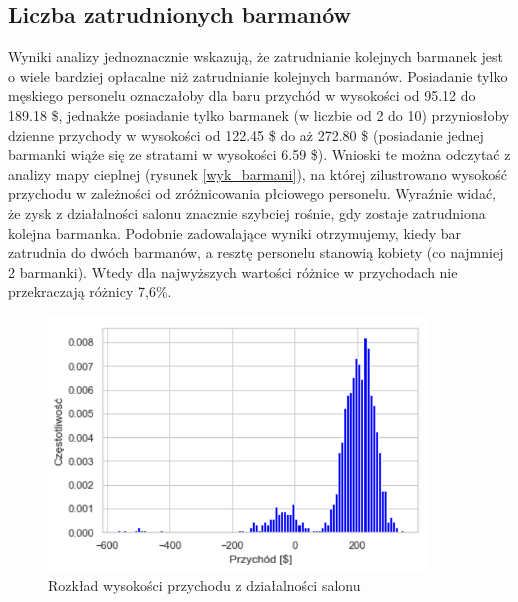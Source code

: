 \documentclass[12pt, a4paper, oneside]{mwart} %
\begin{document}
\subsection{Liczba zatrudnionych barmanów}
Wyniki analizy jednoznacznie wskazują, że zatrudnianie kolejnych barmanek jest o wiele bardziej opłacalne niż zatrudnianie kolejnych barmanów. Posiadanie tylko męskiego personelu oznaczałoby dla baru przychód w wysokości od 95.12 do 189.18 \$, jednakże posiadanie tylko barmanek (w liczbie od 2 do 10) przyniosłoby dzienne przychody w wysokości od 122.45 \$ do aż 272.80 \$ (posiadanie jednej barmanki wiąże się ze stratami w wysokości 6.59 \$). Wnioski te można odczytać z analizy mapy cieplnej (rysunek \ref{wyk_barmani}), na której zilustrowano wysokość przychodu w zależności od zróżnicowania płciowego personelu. Wyraźnie widać, że zysk z działalności salonu znacznie szybciej rośnie, gdy zostaje zatrudniona kolejna barmanka. Podobnie zadowalające wyniki otrzymujemy, kiedy bar zatrudnia do dwóch barmanów, a resztę personelu stanowią kobiety (co najmniej 2 barmanki). Wtedy dla najwyższych wartości różnice w przychodach nie przekraczają różnicy 7,6\%.
\begin{figure}
\centering
\caption{Rozkład wysokości przychodu z działalności salonu}
\label{wyk_przychod}
\includegraphics[width = 0.9\textwidth]{wykresy/histogram.pdf}
\end{figure}
\end{document}
